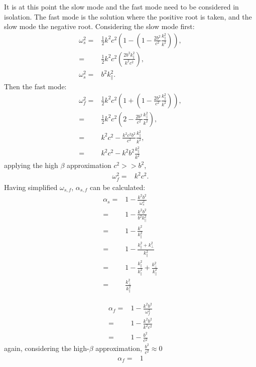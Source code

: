 It is at this point the slow mode and the fast mode need to be considered in isolation.
The fast mode is the solution where the positive root is taken, and the slow mode the negative root.
Considering the slow mode first:
\begin{align}
    \omega^2_{s} =& \frac{1}{2}k^2c^2\left(1 - \left(1 - \frac{2b^2}{c^2} \frac{k^2_\parallel}{k^2}\right)\right),\\
    =& \frac{1}{2}k^2c^2\left(\frac{2b^2k^2_\parallel}{k^2c^2}\right),\\
    \omega^2_{s} =& b^2k^2_\parallel.
\end{align}
Then the fast mode:
\begin{align}
    \omega^2_{f} =& \frac{1}{2}k^2c^2\left(1 + \left(1 - \frac{2b^2}{c^2} \frac{k^2_\parallel}{k^2}\right)\right),\\
                 =& \frac{1}{2}k^2c^2\left(2 - \frac{2b^2}{c^2} \frac{k^2_\parallel}{k^2}\right),\\
                 =& k^2c^2 - \frac{k^2c^2b^2}{c^2}\frac{k^2_\parallel}{k^2},\\
                 =& k^2c^2 - k^2b^2\frac{k^2_\parallel}{k^2}
\end{align}
applying the high $\beta$ approximation $c^2 >> b^2$,
\begin{align}
   \omega^2_{f} =& k^2c^2.
\end{align}
Having simplified $\omega_{s,f}$, $\alpha_{s,f}$ can be calculated:
\begin{align}
    \alpha_s =& 1 - \frac{k^2b^2}{\omega^2_s}\\
             =& 1 - \frac{k^2b^2}{b^2k_\parallel^2}\\
             =& 1 - \frac{k^2}{k_\parallel^2}\\
             =& 1 - \frac{k^2_\parallel + k^2_\perp}{k^2_\parallel}\\
             =& 1 - \frac{k_\parallel^2}{k_\parallel^2} + \frac{k^2_\perp}{k^2_\parallel}\\
             =& \frac{k^2_\perp}{k^2_\parallel}
\end{align}

\begin{align}
    \alpha_f =& 1 - \frac{k^2b^2}{\omega^2_f}\\
    =& 1 - \frac{k^2b^2}{k^2c^2}\\
    =& 1 - \frac{b^2}{c^2}
\end{align}
again, considering the high-$\beta$ approximation, $\displaystyle\frac{b^2}{c^2} \approx 0$
\begin{align}
    \alpha_f =& 1
\end{align}

